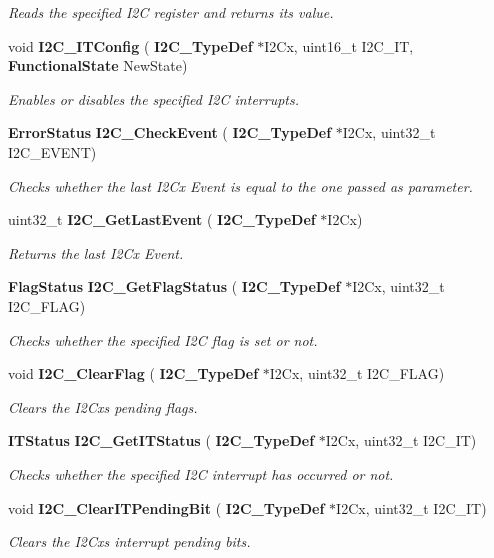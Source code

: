 \begin{DoxyCompactItemize}
\begin{DoxyCompactList}\small\item\em Reads the specified I2C register and returns its value. \end{DoxyCompactList}\item 
void \textbf{ I2\+C\+\_\+\+I\+T\+Config} (\textbf{ I2\+C\+\_\+\+Type\+Def} $\ast$I2\+Cx, uint16\+\_\+t I2\+C\+\_\+\+IT, \textbf{ Functional\+State} New\+State)
\begin{DoxyCompactList}\small\item\em Enables or disables the specified I2C interrupts. \end{DoxyCompactList}\item 
\textbf{ Error\+Status} \textbf{ I2\+C\+\_\+\+Check\+Event} (\textbf{ I2\+C\+\_\+\+Type\+Def} $\ast$I2\+Cx, uint32\+\_\+t I2\+C\+\_\+\+E\+V\+E\+NT)
\begin{DoxyCompactList}\small\item\em Checks whether the last I2\+Cx Event is equal to the one passed as parameter. \end{DoxyCompactList}\item 
uint32\+\_\+t \textbf{ I2\+C\+\_\+\+Get\+Last\+Event} (\textbf{ I2\+C\+\_\+\+Type\+Def} $\ast$I2\+Cx)
\begin{DoxyCompactList}\small\item\em Returns the last I2\+Cx Event. \end{DoxyCompactList}\item 
\textbf{ Flag\+Status} \textbf{ I2\+C\+\_\+\+Get\+Flag\+Status} (\textbf{ I2\+C\+\_\+\+Type\+Def} $\ast$I2\+Cx, uint32\+\_\+t I2\+C\+\_\+\+F\+L\+AG)
\begin{DoxyCompactList}\small\item\em Checks whether the specified I2C flag is set or not. \end{DoxyCompactList}\item 
void \textbf{ I2\+C\+\_\+\+Clear\+Flag} (\textbf{ I2\+C\+\_\+\+Type\+Def} $\ast$I2\+Cx, uint32\+\_\+t I2\+C\+\_\+\+F\+L\+AG)
\begin{DoxyCompactList}\small\item\em Clears the I2\+Cx\textquotesingle{}s pending flags. \end{DoxyCompactList}\item 
\textbf{ I\+T\+Status} \textbf{ I2\+C\+\_\+\+Get\+I\+T\+Status} (\textbf{ I2\+C\+\_\+\+Type\+Def} $\ast$I2\+Cx, uint32\+\_\+t I2\+C\+\_\+\+IT)
\begin{DoxyCompactList}\small\item\em Checks whether the specified I2C interrupt has occurred or not. \end{DoxyCompactList}\item 
void \textbf{ I2\+C\+\_\+\+Clear\+I\+T\+Pending\+Bit} (\textbf{ I2\+C\+\_\+\+Type\+Def} $\ast$I2\+Cx, uint32\+\_\+t I2\+C\+\_\+\+IT)
\begin{DoxyCompactList}\small\item\em Clears the I2\+Cx\textquotesingle{}s interrupt pending bits. \end{DoxyCompactList}\end{DoxyCompactItemize}


